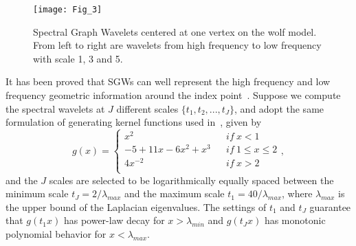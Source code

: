 \begin{figure}[!to]
\begin{center}
\texttt{[image: Fig\_3]}
\end{center}
\caption[Spectral graph wavelets on the wolf model.]
  {Spectral Graph Wavelets centered at one vertex on the wolf
  model. From left to right are wavelets from high frequency to low
  frequency with scale 1, 3 and 5.}
\label{SGW}
\end{figure}

It has been proved that SGWs can well represent the high frequency
and low frequency geometric information around the index
point~\cite{Hammond2011}.  Suppose we compute the spectral wavelets
at $J$ different scales $\{t_1,t_2,...,t_J\}$, and adopt the same
formulation of generating kernel functions used
in~\cite{Hammond2011}, given by
\begin{equation}
g(x)=\left\{
\begin{array}{lcl}
x^2                &      & {if\  x<1}\\
-5 +11x-6x^2 +x^3  &      & {if\  1 \leq x \leq 2}\\
4x^{-2}            &      & {if\  x>2}\\
\end{array} \right.,
\end{equation}
and the $J$ scales are selected to be logarithmically equally spaced
between the minimum scale $t_J = 2/\lambda_{max}$ and the maximum
scale $t_1=40/\lambda_{max}$, where $\lambda_{max}$ is the upper bound
of the Laplacian eigenvalues. The settings of $t_1$ and $t_J$
guarantee that $g(t_1 x)$ has power-law decay for $x>\lambda_{min}$
and $g(t_J x)$ has monotonic polynomial behavior for $x<\lambda_{max}$.

